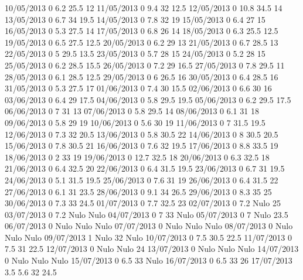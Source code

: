 10/05/2013  0      6.2    25.5   12 
11/05/2013  0      9.4    32     12.5 
12/05/2013  0      10.8   34.5   14 
13/05/2013  0      6.7    34     19.5 
14/05/2013  0      7.8    32     19 
15/05/2013  0      6.4    27     15 
16/05/2013  0      5.3    27.5   14 
17/05/2013  0      6.8    26     14 
18/05/2013  0      6.3    25.5   12.5 
19/05/2013  0      6.5    27.5   12.5 
20/05/2013  0      6.2    29     13 
21/05/2013  0      6.7    28.5   13 
22/05/2013  0      5      29.5   13.5 
23/05/2013  0      5.7    28     15 
24/05/2013  0      5.2    28     15 
25/05/2013  0      6.2    28.5   15.5 
26/05/2013  0      7.2    29     16.5 
27/05/2013  0      7.8    29.5   11 
28/05/2013  0      6.1    28.5   12.5 
29/05/2013  0      6      26.5   16 
30/05/2013  0      6.4    28.5   16 
31/05/2013  0      5.3    27.5   17 
01/06/2013  0      7.4    30     15.5 
02/06/2013  0      6.6    30     16 
03/06/2013  0      6.4    29     17.5 
04/06/2013  0      5.8    29.5   19.5 
05/06/2013  0      6.2    29.5   17.5 
06/06/2013  0      7      31     13 
07/06/2013  0      5.8    29.5   14 
08/06/2013  0      6.1    31     18 
09/06/2013  0      5.8    29     19 
10/06/2013  0      5.6    30     19 
11/06/2013  0      7      31.5   19.5 
12/06/2013  0      7.3    32     20.5 
13/06/2013  0      5.8    30.5   22 
14/06/2013  0      8      30.5   20.5 
15/06/2013  0      7.8    30.5   21 
16/06/2013  0      7.6    32     19.5 
17/06/2013  0      8.8    33.5   19 
18/06/2013  0      2      33     19 
19/06/2013  0      12.7   32.5   18 
20/06/2013  0      6.3    32.5   18 
21/06/2013  0      6.4    32.5   20 
22/06/2013  0      6.4    31.5   19.5 
23/06/2013  0      6.7    31     19.5 
24/06/2013  0      5.1    31.5   19.5 
25/06/2013  0      7.6    31     19 
26/06/2013  0      6.4    31.5   22 
27/06/2013  0      6.1    31     23.5 
28/06/2013  0      9.1    34     26.5 
29/06/2013  0      8.3    35     25 
30/06/2013  0      7.3    33     24.5 
01/07/2013  0      7.7    32.5   23 
02/07/2013  0      7.2   Nulo    25 
03/07/2013  0      7.2   Nulo   Nulo
04/07/2013  0      7      33    Nulo
05/07/2013  0      7     Nulo    23.5 
06/07/2013  0     Nulo   Nulo   Nulo
07/07/2013  0     Nulo   Nulo   Nulo
08/07/2013  0     Nulo   Nulo   Nulo
09/07/2013  1     Nulo    32    Nulo
10/07/2013  0      7.5    30.5   22.5 
11/07/2013  0      7.5    31     22.5 
12/07/2013  0     Nulo   Nulo    24 
13/07/2013  0     Nulo   Nulo   Nulo
14/07/2013  0     Nulo   Nulo   Nulo
15/07/2013  0      6.5    33    Nulo
16/07/2013  0      6.5    33     26 
17/07/2013  3.5    5.6    32     24.5 
